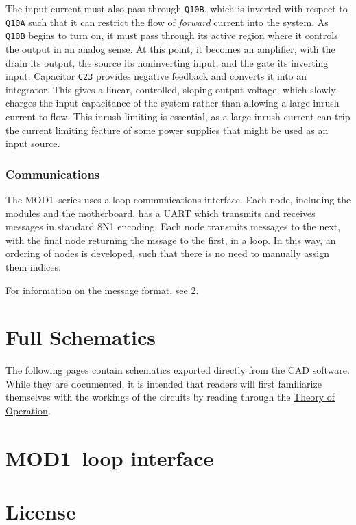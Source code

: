 \documentclass[letterpaper,twocolumn,10pt,openany,oneside,final,fleqn]{memoir}
\newcommand{\Series}{MOD1\ }
\newcommand{\rd}[1]{\texttt{#1}}
\begin{document}
The input current must also pass through \rd{Q10B}, which is inverted with respect
to \rd{Q10A} such that it can restrict the flow of \emph{forward} current into the
system. As \rd{Q10B} begins to turn on, it must pass through its active region where
it controls the output in an analog sense. At this point, it becomes an amplifier,
with the drain its output, the source its noninverting input, and the gate its
inverting input. Capacitor \rd{C23} provides negative feedback and converts it into
an integrator. This gives a linear, controlled, sloping output voltage, which
slowly charges the input capacitance of the system rather than allowing a large
inrush current to flow. This inrush limiting is essential, as a large inrush current
can trip the current limiting feature of some power supplies that might be used
as an input source.

\subsection{Communications}

The \Series series uses a loop communications interface. Each node, including the modules
and the motherboard, has a UART which transmits and receives messages in standard
8N1 encoding. Each node transmits messages to the next, with the final node returning
the mssage to the first, in a loop. In this way, an ordering of nodes is developed, such
that there is no need to manually assign them indices.

For information on the message format, see \cref{app:loopif}.


\appendix

\newpage
\chapter{Full Schematics}
The following pages contain schematics exported directly from the CAD software.
While they are documented, it is intended that readers will first familiarize
themselves with the workings of the circuits by reading through the
\hyperref[chap:too]{Theory of Operation}.



\newpage
\chapter{\Series loop interface}
\label{app:loopif}

\newpage
\chapter{License}
\end{document}

